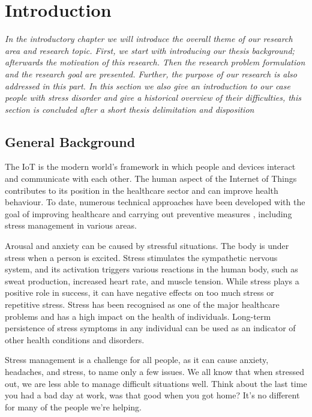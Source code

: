 \chapter{Introduction}
\textit{In  the  introductory  chapter  we  will  introduce  the  overall  theme  of  our research area  and research  topic.  First,  we  start  with  introducing  our  thesis background;  afterwards  the motivation of this research. Then the research problem formulation and the research goal are presented. Further, the purpose of our research is also addressed in this part. In this section we also give an introduction to our case people with stress disorder and  give  a  historical  overview  of  their  difficulties, this section is concluded after a short thesis delimitation and disposition}
\vspace{5mm}

\section{General Background}
The \acf{IoT} is the modern world's framework in which people and devices interact and communicate with each other.  The human aspect of the Internet of Things contributes to its position in the healthcare sector and can improve health behaviour. To date, numerous technical approaches have been developed with the goal of improving healthcare and carrying out preventive measures \citep{Trmcic2017InternetWell-being}, including stress management in various areas.

Arousal and anxiety can be caused by stressful situations.  The body is under stress when a person is excited. Stress stimulates the sympathetic nervous system, and its activation triggers various reactions in the human body, such as sweat production, increased heart rate, and muscle tension. While stress plays a positive role in success, it can have negative effects on too much stress or repetitive stress. Stress has been recognised as one of the major healthcare problems and has a high impact on the health of individuals. Long-term persistence of stress symptoms in any individual can be used as an indicator of other health conditions and disorders.

Stress management is a challenge for all people, as it can cause anxiety, headaches, and stress, to name only a few issues. We all know that when stressed out, we are less able to manage difficult situations well. Think about the last time you had a bad day at work, was that good when you got home? It's no different for many of the people we're helping.

